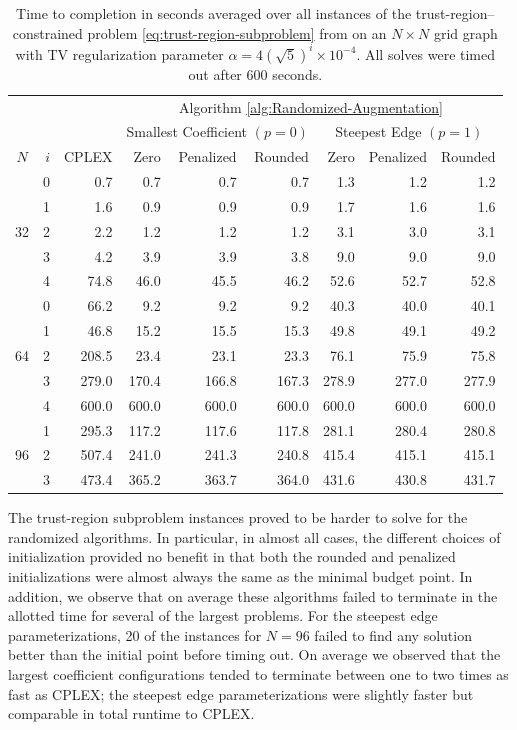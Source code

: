 \documentclass[pdflatex,sn-mathphys-num]{sn-jnl}%
\begin{document}
\begin{table}[]
    \centering
\begin{tabular}{cr|r|rrr|rrr}
 &  &       & \multicolumn{6}{c}{Algorithm \ref{alg:Randomized-Augmentation}} \\
 &  &       & \multicolumn{3}{c}{Smallest Coefficient $(p=0)$} & \multicolumn{3}{|c}{Steepest Edge $(p=1)$} \\ $N$ & $i$ & CPLEX & Zero & Penalized & Rounded & Zero & Penalized & Rounded \\
\hline
\multirow[t]{5}{*}{32} & 0 & 0.7 & 0.7 & 0.7 & 0.7 & 1.3 & 1.2 & 1.2 \\
 & 1 & 1.6 & 0.9 & 0.9 & 0.9 & 1.7 & 1.6 & 1.6 \\
 & 2 & 2.2 & 1.2 & 1.2 & 1.2 & 3.1 & 3.0 & 3.1 \\
 & 3  & 4.2 & 3.9 & 3.9 & 3.8 & 9.0 & 9.0 & 9.0 \\
 & 4 & 74.8 & 46.0 & 45.5 & 46.2 & 52.6 & 52.7 & 52.8 \\
\hline
\multirow[t]{5}{*}{64} & 0 & 66.2 & 9.2 & 9.2 & 9.2 & 40.3 & 40.0 & 40.1 \\
 & 1 & 46.8 & 15.2 & 15.5 & 15.3 & 49.8 & 49.1 & 49.2 \\
 & 2 & 208.5 & 23.4 & 23.1 & 23.3 & 76.1 & 75.9 & 75.8 \\
 & 3 & 279.0 & 170.4 & 166.8 & 167.3 & 278.9 & 277.0 & 277.9 \\
 & 4 & 600.0 & 600.0 & 600.0 & 600.0 & 600.0 & 600.0 & 600.0 \\
\hline
\multirow[t]{3}{*}{96} & 1 & 295.3 & 117.2 & 117.6 & 117.8 & 281.1 & 280.4 & 280.8 \\
 & 2 & 507.4 & 241.0 & 241.3 & 240.8 & 415.4 & 415.1 & 415.1 \\
 & 3 & 473.4 & 365.2 & 363.7 & 364.0 & 431.6 & 430.8 & 431.7 \\
\end{tabular}
    \caption{Time to completion in seconds averaged over all instances of the trust-region--constrained problem \eqref{eq:trust-region-subproblem} from \cite{manns2024discrete} on an $N\times N$ grid graph with TV regularization parameter $\alpha = 4(\sqrt{5})^i \times 10^{-4}$. All solves were timed out after 600 seconds.}
    \label{tab:trust-region-times}
\end{table}


The trust-region subproblem instances proved to be harder to solve for the randomized algorithms. In particular,  in almost all cases, the different choices of initialization provided no benefit in that both the rounded and penalized initializations were almost always the same as the minimal budget point. In addition, we observe that on average these algorithms failed to terminate in the allotted time for several of the largest problems. For the steepest edge parameterizations, 20 of the instances for $N=96$ failed to find any solution better than the initial point before timing out. On average we observed that the largest coefficient configurations tended to terminate between one to two times as fast as CPLEX; the steepest edge parameterizations were slightly faster but comparable in total runtime to CPLEX.
\end{document}
